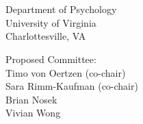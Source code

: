 
\begin{titlepage}

\begin{addmargin}[-1cm]{-3cm}
\begin{center}
\large

\hfill
\vfill

\begingroup
\color{Maroon}\spacedallcaps{\myTitle} \\ \bigskip %
\endgroup

\spacedlowsmallcaps{\myName} %

\vfill
\mySubtitle \\ \medskip %
Department of Psychology \\
University of Virginia \\
Charlottesville, VA \\

\vfill

Proposed Committee: \\
Timo von Oertzen (co-chair) \\
Sara Rimm-Kaufman (co-chair) \\
Brian Nosek \\
Vivian Wong

\end{center}
\end{addmargin}

\end{titlepage}